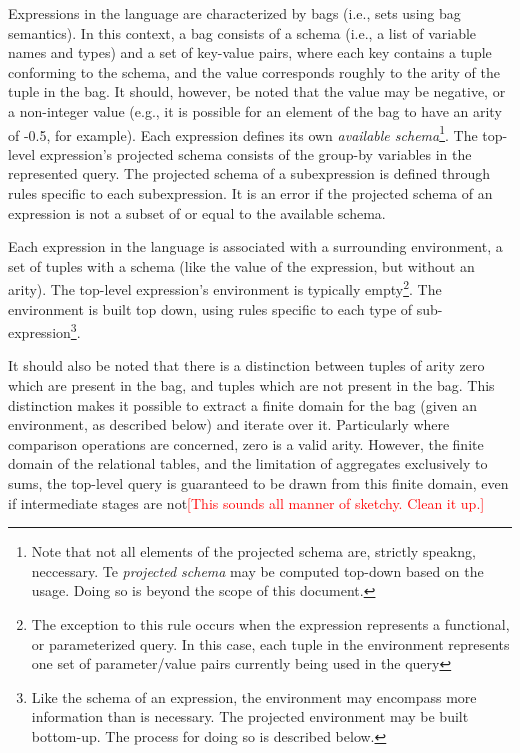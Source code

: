 \documentclass[11pt]{amsart}
\newcommand{\todo}[1]{\textcolor{red}{[#1]}}
\begin{document}
Expressions in the language are characterized by bags (i.e., sets using bag semantics).  In this context, a bag consists of a schema (i.e., a list of variable names and types) and a set of key-value pairs, where each key contains a tuple conforming to the schema, and the value corresponds roughly to the arity of the tuple in the bag.  It should, however, be noted that the value may be negative, or a non-integer value (e.g., it is possible for an element of the bag to have an arity of -0.5, for example).  Each expression defines its own {\it available schema}\footnote{Note that not all elements of the projected schema are, strictly speakng, neccessary.  Te {\it projected schema} may be computed top-down based on the usage.  Doing so is beyond the scope of this document.}.  The top-level expression's projected schema consists of the group-by variables in the represented query.  The projected schema of a subexpression is defined through rules specific to each subexpression.  It is an error if the projected schema of an expression is not a subset of or equal to the available schema. 

Each expression in the language is associated with a surrounding environment, a set of tuples with a schema (like the value of the expression, but without an arity).  The top-level expression's environment is typically empty\footnote{The exception to this rule occurs when the expression represents a functional, or parameterized query. In this case, each tuple in the environment represents one set of parameter/value pairs currently being used in the query}.  The environment is built top down, using rules specific to each type of sub-expression\footnote{Like the schema of an expression, the environment may encompass more information than is necessary.  The projected environment may be built bottom-up.  The process for doing so is described below.}.

It should also be noted that there is a distinction between tuples of arity zero which are present in the bag, and tuples which are not present in the bag.  This distinction makes it possible to extract a finite domain for the bag (given an environment, as described below) and iterate over it.  Particularly where comparison operations are concerned, zero is a valid arity.  However, the finite domain of the relational tables, and the limitation of aggregates exclusively to sums, the top-level query is guaranteed to be drawn from this finite domain, even if intermediate stages are not\todo{This sounds all manner of sketchy.  Clean it up.}
\end{document}
